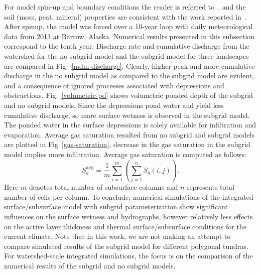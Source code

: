 \documentclass[review,11pt]{elsarticle}
\begin{document}
For model spin-up and boundary conditions the reader is referred to~\cite{spainter2016integrated}, and the soil (moss, peat, mineral)  properties are consistent with the work reported in~\cite{atchley2015}. After spinup, the model was forced over a 10-year loop with daily meteorological data from 2013 at Barrow, Alaska. Numerical results presented in this subsection correspond to the tenth year. Discharge rate and cumulative discharge from the watershed for the no subgrid model and the subgrid model for three landscapes are compared in Fig.~\ref{mdm-discharge}. Clearly, higher peak and more cumulative discharge in the no subgrid model as compared to the subgrid model are evident, and a consequence of ignored processes associated with depressions and obstructions. Fig.~\ref{volumetric-pd} shows volumetric ponded depth of the subgrid and no subgrid models. Since the depressions pond water and yield less cumulative discharge, so more surface wetness is observed in the subgrid model. The ponded water in the surface depressions is solely available for infiltration and evaporation. Average gas saturation resulted from no subgrid and subgrid models are plotted in Fig~\ref{gas-saturation}, decrease in the gas saturation in the subgrid model implies more infiltration. Average gas saturation is computed as follows:
\begin{equation}
S_g^{\text{avg}} = \frac{1}{m}\sum\limits_{i=1}^{m}{ \left ( \sum\limits_{j=1}^{n} S_g(i,j) \right) }.
\end{equation}
Here $m$ denotes total number of subsurface columns and $n$ represents total number of cells per column.
To conclude, numerical simulations of the integrated surface/subsurface model with subgrid parameterization show significant influences on the surface wetness and hydrographs, however relatively less effects on the active layer thickness and thermal surface/subsurface conditions for the current climate.
Note that in this work, we are not making an attempt to compare simulated results of the subgrid model for different polygonal tundras. For watershed-scale integrated simulations, the focus is on the comparison of the numerical results of the subgrid and no subgrid models.
\end{document}
